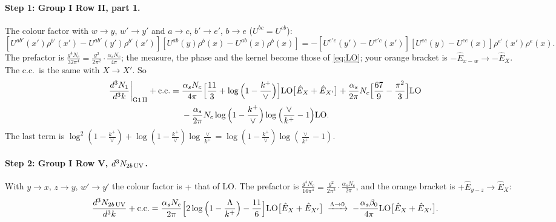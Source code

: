 \documentclass[10pt]{article}
\numberwithin{equation}{section}
\newcommand{\LO}{{\rm LO}}
\begin{document}
\paragraph{Step 1: Group I Row II, part 1.} The colour factor with $w\to y$, $w'\to y'$ and $a\to c$, $b'\to e'$, $b\to e$ ($U^{bc}=U^{cb}$):
\begin{equation*}
\left[U^{ab'}(x')\rho^{b'}(x')-U^{ab'}(y')\rho^{b'}(x')\right]\left[U^{ab}(y)\rho^{b}(x)-U^{ab}(x)\rho^{b}(x)\right]=-\left[U^{e'c}(y')-U^{e'c}(x')\right]\left[U^{ec}(y)-U^{ce}(x)\right]\rho^{e'}(x')\rho^{e}(x).
\end{equation*}
The prefactor is $\frac{g^4N_c}{32\pi^4}=\frac{g^2}{2\pi^2}\cdot\frac{\alpha_sN_c}{4\pi}$; the measure, the phase and the kernel become those of \eqref{eq:LO}; your orange bracket is $-\hat E_{x-w}\to-\hat E_X$. The c.c.\ is the same with $X\to X'$. So
\begin{align}
\frac{d^3N_{1}}{d^3k}\bigg|_{\rm G1\,II}+{\rm c.c.}={}&\frac{\alpha_sN_c}{4\pi}\Big[\frac{11}{3}+\log\Big(1-\frac{k^+}{\vee}\Big)\Big]\LO\big[\hat E_X+\hat E_{X'}\big]+\frac{\alpha_s}{2\pi}N_c\Big[\frac{67}{9}-\frac{\pi^2}{3}\Big]\LO\notag\\
&-\frac{\alpha_s}{2\pi}N_c\log\Big(1-\frac{k^+}{\vee}\Big)\log\Big(\frac{\vee}{k^+}-1\Big)\LO.\label{eq:G1II}
\end{align}
The last term is $\log^2(1-\frac{k^+}{\vee})+\log(1-\frac{k^+}{\vee})\log\frac{\vee}{k^+}=\log(1-\frac{k^+}{\vee})\log(\frac{\vee}{k^+}-1)$.

\paragraph{Step 2: Group I Row V, $d^3N_{2b\,\rm UV}$.} With $y\to x$, $z\to y$, $w'\to y'$ the colour factor is $+$ that of LO. The prefactor is $\frac{g^4N_c}{16\pi^4}=\frac{g^2}{2\pi^2}\cdot\frac{\alpha_sN_c}{2\pi}$, and the orange bracket is $+\hat E_{y-z}\to\hat E_X$:
\begin{equation}
\frac{d^3N_{2b\,\rm UV}}{d^3k}+{\rm c.c.}=\frac{\alpha_sN_c}{2\pi}\Big[2\log\Big(1-\frac{\Lambda}{k^+}\Big)-\frac{11}{6}\Big]\LO\big[\hat E_X+\hat E_{X'}\big]\;\xrightarrow{\Lambda\to0}\;-\frac{\alpha_s\beta_0}{4\pi}\LO\big[\hat E_X+\hat E_{X'}\big].\label{eq:2bUV}
\end{equation}
\end{document}
